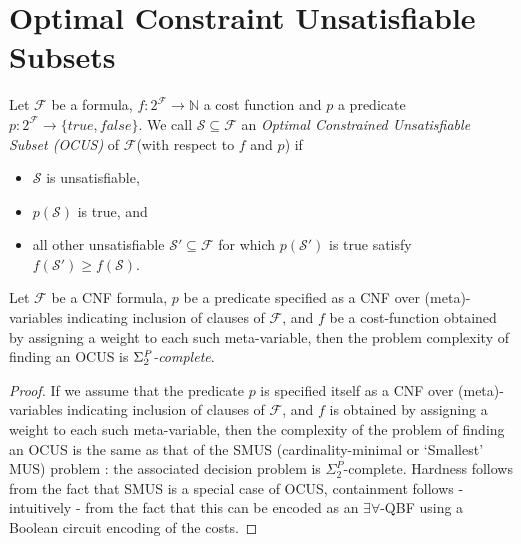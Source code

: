 \documentclass{llncs}
\newcommand\m[1]{\mathcal{#1}}
\newcommand\comment[1]{\marginpar{\tiny #1}}
\renewcommand\comment[1]{#1}
\newcommand{\tias}[1]{{\comment{\color{blue}Tias:#1}}}
\newcommand{\bart}[1]{{\comment{\color{OliveGreen}Bart: #1}}}
\newcommand\formula{\ensuremath{\m{F} }\xspace}
\newcommand\formulag{\ensuremath{\m{G} }\xspace}
\newcommand\mm[1]{\ensuremath{#1}\xspace}
\newcommand\nat{\mm{\mathbb{N}}}
\begin{document}
\section{Optimal Constraint Unsatisfiable Subsets}

\begin{definition}\label{definition:ocus}
	Let $\formula$ be a formula, $f:2^{\formula} \to \nat$ a cost function and  $p$ a predicate $p: 2^{\formula} \to \{\mathit{true}, \mathit{false} \}$. 
	We call %
		$\m{S} \subseteq \formula$ an \emph{Optimal Constrained Unsatisfiable Subset (OCUS)} of \formula (with respect to $f$ and $p$) if 
		\begin{itemize}%
			\item $\m{S}$ is unsatisfiable,
			\item $p(\m{S})$ is true, and
			\item all other unsatisfiable $\m{S}'\subseteq \formula$ for which $p(\m{S}')$ is true satisfy $f(\m{S}')\geq f(\m{S})$.
		\end{itemize}
\end{definition}
	
	\begin{proposition}
		Let \emph{\formula} be a CNF formula, ${p}$ be a predicate specified as a CNF over (meta)-variables indicating inclusion of clauses of \emph{\formula}, and ${f}$ be a cost-function obtained by assigning a weight to each such meta-variable, then the problem complexity of finding an OCUS is \emph{$\Sigma^\emph{P}_2$-complete}.
	\end{proposition}
\begin{proof}
	If we assume that the predicate $p$ is specified itself as a CNF over (meta)-variables indicating inclusion of clauses of $\m{F}$, and $f$ is obtained by assigning a weight to each such meta-variable, then the complexity of the problem of finding an OCUS is the same as that of the SMUS (cardinality-minimal or `Smallest' MUS) problem  \cite{ignatiev2015smallest}: the associated decision problem is $\Sigma^P_2$-complete.
	Hardness follows from the fact that SMUS is a special case of OCUS, containment follows - intuitively - from the fact that this can be encoded as an $\exists\forall$-QBF using a Boolean circuit encoding of the costs. 
\end{proof}
\end{document}
